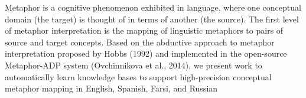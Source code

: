 Metaphor is a cognitive phenomenon exhibited in language, where one conceptual domain (the target) is thought of in terms of another (the source). The first level of metaphor interpretation is the mapping of linguistic metaphors to pairs of source and target concepts. Based on the abductive approach to metaphor interpretation proposed by Hobbs (1992) and implemented in the open-source Metaphor-ADP system (Ovchinnikova et al., 2014), we present work to automatically learn knowledge bases to support high-precision conceptual metaphor mapping in English, Spanish, Farsi, and Russian
